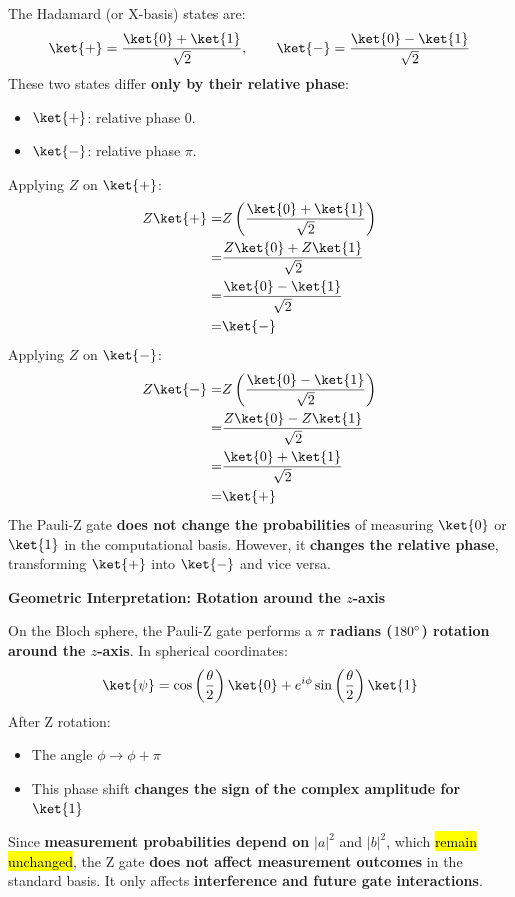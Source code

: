 \begin{examplebox}
    The Hadamard (or X-basis) states are:
    \begin{equation*}
        \ket{+} = \dfrac{\ket{0} + \ket{1}}{\sqrt{2}}, \hspace{2em} \ket{-} = \dfrac{\ket{0} - \ket{1}}{\sqrt{2}}
    \end{equation*}
    These two states differ \textbf{only by their relative phase}:
    \begin{itemize}
        \item $\ket{+}$: relative phase $0$.
        \item $\ket{-}$: relative phase $\pi$.
    \end{itemize}
    Applying $Z$ on $\ket{+}$:
    \begin{align*}
        Z\ket{+} =& Z\left( \dfrac{\ket{0} + \ket{1}}{\sqrt{2}} \right) \\
        =& \dfrac{Z\ket{0} + Z\ket{1}}{\sqrt{2}} \\
        =& \dfrac{\ket{0} - \ket{1}}{\sqrt{2}} \\
        =& \ket{-}
    \end{align*}
    Applying $Z$ on $\ket{-}$:
    \begin{align*}
        Z\ket{-} =& Z\left( \dfrac{\ket{0} - \ket{1}}{\sqrt{2}} \right) \\
        =& \dfrac{Z\ket{0} - Z\ket{1}}{\sqrt{2}} \\
        =& \dfrac{\ket{0} + \ket{1}}{\sqrt{2}} \\
        =& \ket{+}
    \end{align*}
    The Pauli-Z gate \textbf{does not change the probabilities} of measuring $\ket{0}$ or $\ket{1}$ in the computational basis. However, it \textbf{changes the relative phase}, transforming $\ket{+}$ into $\ket{-}$ and vice versa.
\end{examplebox}

\begin{flushleft}
    \textcolor{Green3}{ \textbf{Geometric Interpretation: Rotation around the $z$-axis}}
\end{flushleft}
On the Bloch sphere, the Pauli-Z gate performs a \textbf{$\pi$ radians ($180^\circ$) rotation around the $z$-axis}. In spherical coordinates:
\begin{equation*}
    \ket{\psi} = \cos\left(\dfrac{\theta}{2}\right)\ket{0} + e^{i \phi} \sin\left(\dfrac{\theta}{2}\right)\ket{1}
\end{equation*}
After Z rotation:
\begin{itemize}
    \item The angle $\phi \rightarrow \phi + \pi$
    \item This phase shift \textbf{changes the sign of the complex amplitude for} $\ket{1}$
\end{itemize}
Since \textbf{measurement probabilities depend on} $\left|a\right|^{2}$ and $\left|b\right|^{2}$, which \hl{remain unchanged}, the Z gate \textbf{does not affect measurement outcomes} in the standard basis. It only affects \textbf{interference and future gate interactions}.

